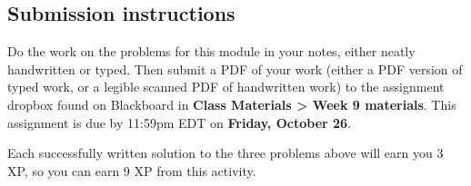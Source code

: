 \documentclass[11pt]{article}
\begin{document}
\vspace{0.5in}

\subsection*{Submission instructions}

Do the work on the problems for this module in your notes, either neatly handwritten or typed. Then submit a PDF of your work (either a PDF version of typed work, or a legible scanned PDF of handwritten work) to the assignment dropbox found on Blackboard in \textbf{Class Materials > Week 9 materials}. This assignment is due by 11:59pm EDT on \textbf{Friday, October 26}. 

Each successfully written solution to the three problems above will earn you 3 XP, so you can earn 9 XP from this activity. 
\end{document}

